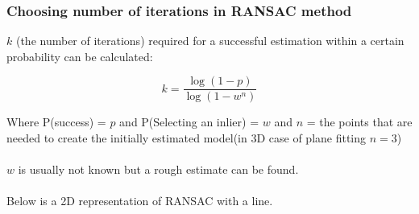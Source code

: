 			
			\subsubsection{Choosing number of iterations in RANSAC method}
				$k$ (the number of iterations) required for a successful estimation within a certain probability can be calculated:
				
				\begin{equation}
					k = \frac{\log(1-p)}{\log(1- w^n)}
				\end{equation}
				
				Where P(success) = $p$ and P(Selecting an inlier) = $w$ and $n$ = the points that are needed to create the initially estimated model(in 3D case of plane fitting $n = 3$)\\
				\\
				$w$ is usually not known but a rough estimate can be found.\\
				\\
				Below is a 2D representation of RANSAC with a line.
			
